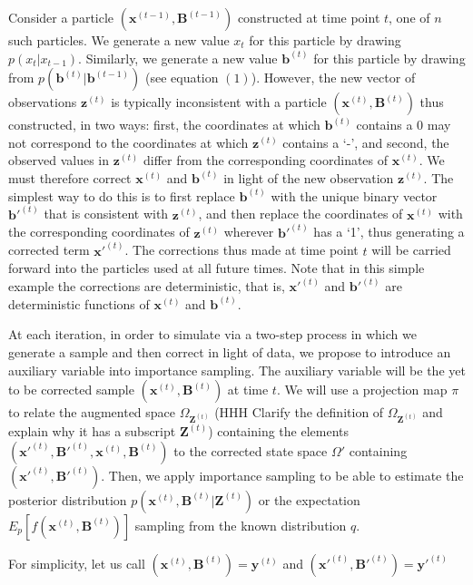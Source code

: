\documentclass[11pt,a4paper]{article}
\renewcommand{\vec}[1]{\mathbf{#1}}
\begin{document}
Consider a particle $(\vec{x}^{(t-1)},\vec{B}^{(t-1)})$ constructed at time point $t$, one of $n$ such particles. We generate a new value $x_t$ for this particle by drawing $p(x_t | x_{t-1})$. Similarly, we generate a new value $\vec{b}^{(t)}$ for this particle by drawing from $p(\vec{b}^{(t)} | \vec{b}^{(t-1)})$ (see equation $(1)$). However, the new vector of observations $\vec{z}^{(t)}$ is typically inconsistent with a particle $(\vec{x}^{(t)}, \vec{B}^{(t)})$ thus constructed, in two ways: first, the coordinates at which $\vec{b}^{(t)}$ contains a 0 may not correspond to the coordinates at which $\vec{z}^{(t)}$ contains a `-', and second, the observed values in $\vec{z}^{(t)}$ differ from the corresponding coordinates of $\vec{x}^{(t)}$. We must therefore correct $\vec{x}^{(t)}$ and $\vec{b}^{(t)}$ in light of the new observation $\vec{z}^{(t)}$. The simplest way to do this is to first replace $\vec{b}^{(t)}$ with the unique binary vector $\vec{b'}^{(t)}$ that is consistent with $\vec{z}^{(t)}$, and then replace the coordinates of $\vec{x}^{(t)}$ with the corresponding coordinates of $\vec{z}^{(t)}$ wherever $\vec{b'}^{(t)}$ has a `1', thus generating a corrected term $\vec{x'}^{(t)}$. The corrections thus made at time point $t$ will be carried forward into the particles used at all future times. Note that in this simple example the corrections are deterministic, that is, $\vec{x'}^{(t)}$ and $\vec{b'}^{(t)}$ are deterministic functions of $\vec{x}^{(t)}$ and $\vec{b}^{(t)}$. 

At each iteration, in order to simulate via a two-step process in which we generate a sample and then correct in light of data, we propose to introduce an auxiliary variable into importance sampling. The auxiliary variable will be the yet to be corrected sample $(\vec{x}^{(t)}, \vec{B}^{(t)})$ at time $t$. We will use a projection map $\pi$ to relate the augmented space $\Omega_{\vec{Z}^{(t)}}$ {\color{red} (HHH Clarify the definition of $\Omega_{\vec{Z}^{(t)}}$ and explain why it has a subscript $\vec{Z}^{(t)}$)} containing the elements $(\vec{x'}^{(t)}, \vec{B'}^{(t)}, \vec{x}^{(t)}, \vec{B}^{(t)})$ to the corrected state space $\Omega'$ containing $(\vec{x'}^{(t)}, \vec{B'}^{(t)})$. Then, we apply importance sampling to be able to estimate the posterior distribution $p(\vec{x}^{(t)}, \vec{B}^{(t)} | \vec{Z}^{(t)})$ or the expectation $E_{p}[f(\vec{x}^{(t)},\vec{B}^{(t)})]$  sampling from the known distribution $q$.

For simplicity, let us call $(\vec{x}^{(t)}, \vec{B}^{(t)}) = \vec{y}^{(t)}$ and $(\vec{x'}^{(t)}, \vec{B'}^{(t)}) = \vec{y'}^{(t)}$
\end{document}
